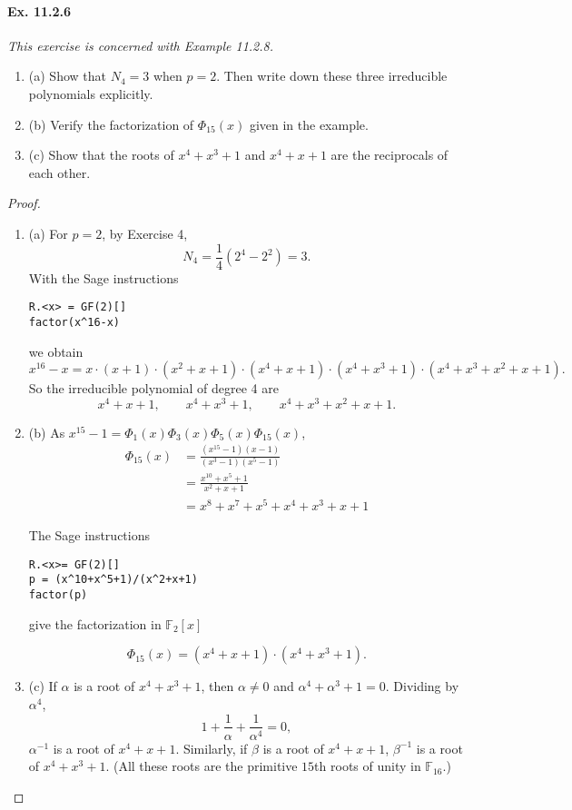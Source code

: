 \documentclass[11pt,a4paper]{article}
\newcommand{\be} {\begin{enumerate}}
\newcommand{\ee} {\end{enumerate}}
\newcommand{\F}{\mathbb{F}}
\begin{document}
\paragraph{Ex. 11.2.6}

{\it This exercise is concerned with Example 11.2.8.
\be
\item[(a)] Show that $N_4 = 3$ when $p=2$. Then write down these three irreducible polynomials explicitly.

\item[(b)] Verify the factorization of $\Phi_{15}(x)$ given in the example.

\item[(c)] Show that the roots of $x^4+x^3+1$ and $x^4+x+1$ are the reciprocals of each other.
\ee
}

\begin{proof}
\be
\item[(a)]
For $p=2$, by Exercise 4,
$$N_4 = \frac{1}{4}(2^4-2^2) = 3.$$
With the Sage instructions
\begin{verbatim}
R.<x> = GF(2)[]
factor(x^16-x)
\end{verbatim}
we obtain 
$$x^{16} - x = x \cdot (x + 1) \cdot (x^{2} + x + 1) \cdot (x^{4} + x + 1) \cdot (x^{4}
+ x^{3} + 1) \cdot (x^{4} + x^{3} + x^{2} + x + 1).$$
So the irreducible polynomial of degree 4 are
$$ x^{4} + x + 1 , \qquad x^{4}
+ x^{3} + 1 ,\qquad x^{4} + x^{3} + x^{2} + x + 1.$$

\item[(b)]As $x^{15} - 1 = \Phi_1(x) \Phi_3(x) \Phi_5(x) \Phi_{15}(x)$,
\begin{align*}
\Phi_{15}(x) &= \frac{(x^{15}-1)(x-1)}{(x^3-1)(x^5-1)}\\
&= \frac{x^{10}+x^5+1}{x^2+x+1}\\
&= x^8+x^7 +x^5 +x^4+x^3 + x+1
\end{align*}

The Sage instructions
\begin{verbatim}
R.<x>= GF(2)[]
p = (x^10+x^5+1)/(x^2+x+1)
factor(p)
\end{verbatim}
give the factorization in $\F_2[x]$

$$\Phi_{15}(x) = (x^{4} + x + 1) \cdot (x^{4} + x^{3} + 1).$$

\item[(c)]
If $\alpha$ is a root of $x^4+x^3+1$, then $\alpha \ne 0$ and $\alpha^4 + \alpha^3+1 = 0$. Dividing by $\alpha^4$, $$1 + \frac{1}{\alpha} + \frac{1}{\alpha^4} = 0,$$ $\alpha^{-1}$ is a root of $x^4+x+1$. Similarly, if $\beta$ is a root of $x^4+x+1$, $\beta^{-1}$ is a root of $x^4+x^3+1$.
(All these roots are the primitive $15$th roots of unity in $\F_{16}$.)
\ee
\end{proof}
\end{document}
